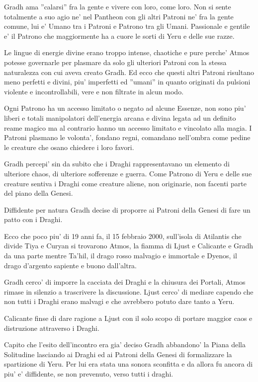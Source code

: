\documentclass[a4paper,11pt,twoside,openany]{book}
\begin{document}
{		Gradh ama ''calarsi'' fra la gente e vivere con loro, come loro. 
		Non si sente totalmente a suo agio ne' nel Pantheon con gli altri Patroni ne' fra la gente comune, lui e' Umano tra i Patroni e Patrono tra gli Umani. Passionale e gentile e' il Patrono che maggiormente ha a cuore le sorti di Yeru e delle sue razze.
		
		Le lingue di energie divine erano troppo intense, chaotiche e pure perche' Atmos potesse governarle per plasmare da solo gli ulteriori Patroni con la stessa naturalezza con cui aveva creato Gradh. Ed ecco che questi altri Patroni risultano meno perfetti e divini, piu' imperfetti ed ''umani'' in quanto originati da pulsioni violente e incontrollabili, vere e non filtrate in alcun modo.
		
		Ogni Patrono ha un accesso limitato o negato ad alcune Essenze, non sono piu' liberi e totali manipolatori dell'energia arcana e divina legata ad un definito reame magico ma al contrario hanno un accesso limitato e vincolato alla magia. 
		I Patroni plasmano le volonta', fondano regni, comandano nell'ombra come pedine le creature che osano chiedere i loro favori.
		
		Gradh percepi' sin da subito che i Draghi rappresentavano un elemento di ulteriore chaos, di ulteriore sofferenze e guerra. Come Patrono di Yeru e delle sue creature sentiva i Draghi come creature aliene, non originarie, non facenti parte del piano della Genesi.
		
		Diffidente per natura Gradh decise di proporre ai Patroni della Genesi di fare un patto con i Draghi.
		
		Ecco che poco piu' di 19 anni fa, il 15 febbraio 2000, sull'isola di Atilantis che divide Tiya e Curyan si trovarono Atmos, la fiamma di Ljust e Calicante e Gradh da una parte mentre Ta'hil, il drago rosso malvagio e immortale e Dyenos, il drago d'argento sapiente e buono dall'altra.
		
		Gradh cerco' di imporre la cacciata dei Draghi e la chiusura dei Portali, Atmos rimase in silenzio a trascrivere la discussione. Ljust cerco' di mediare capendo che non tutti i Draghi erano malvagi e che avrebbero potuto dare tanto a Yeru.
		
		Calicante finse di dare ragione a Ljust con il solo scopo di portare maggior caos e distruzione attraverso i Draghi.
		
		Capito che l'esito dell'incontro era gia' deciso Gradh abbandono' la Piana della Solitudine lasciando ai Draghi ed ai Patroni della Genesi di formalizzare la spartizione di Yeru. Per lui era stata una sonora sconfitta e da allora fu ancora di piu' e' diffidente, se non prevenuto, verso tutti i draghi.
		
}
\end{document}
